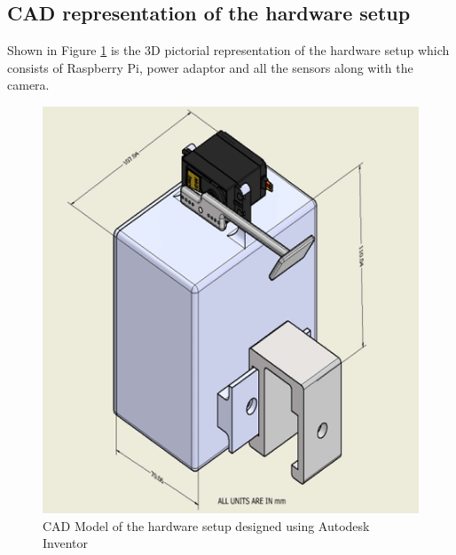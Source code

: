 \documentclass[12pt,a4paper]{report}
\begin{document}
\subsection{CAD representation of the hardware setup}
Shown in Figure \ref{fig:hardware} is the 3D pictorial representation of the hardware setup which consists of Raspberry Pi, power adaptor and all the sensors along with the camera.
\begin{figure}[H]
  \centering
  \includegraphics[scale=1]{./pic/hardware.png}
  \caption{CAD Model of the hardware setup designed using Autodesk Inventor}
  \label{fig:hardware}
\end{figure}
\end{document}
